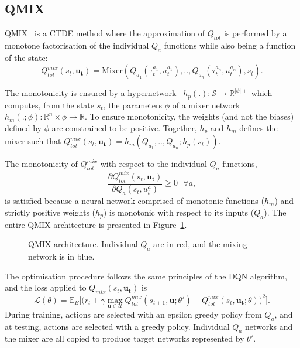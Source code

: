 \subsection{QMIX}
QMIX~\citep{Rashid2018} is a CTDE method where the approximation of $Q_{tot}$ is performed by a monotone factorisation of the individual $Q_a$ functions while also being a function of the state:
\begin{equation}
     Q_{tot}^{mix}(s_t, \mathbf{u_t})=\text{Mixer} \left(Q_{a_1}(\tau^{a_1}_t, u_t^{a_1}) ,..,Q_{a_n}(\tau^{a_n}_t, u_t^{a_n}), s_t\right).
     \label{eq:ch3_qmixappendix}
\end{equation}

The monotonicity is ensured by a hypernetwork~\citep{Ha2016HyperNetworks} $h_p(.): \mathcal{S} \rightarrow \mathbb{R}^{|\phi|+}$ which computes, from the state $s_t$, the parameters $\phi$ of a mixer network $h_m(.;\phi):\mathbb{R}^n \times \phi \rightarrow \mathbb{R}$.
To ensure monotonicity, the weights (and not the biases) defined by $\phi$ are constrained to be positive.
Together, $h_p$ and $h_m$ defines the mixer such that $ Q_{tot}^{mix}(s_t, \mathbf{u_t}) = h_m\left(Q_{a_1},..,Q_{a_n}; h_p(s_t)\right)$.

The monotonicity of $Q_{tot}^{mix}$ with respect to the individual $Q_a$ functions, 
\begin{equation}
    \frac{\partial Q_{tot}^{mix}(s_t, \mathbf{u_t})}{\partial Q_{a}(s_t, u_t^{a})} \geq 0 \text{ } \forall a
    \label{eq:ch3_monotonicity},
\end{equation}
is satisfied because a neural network comprised of monotonic functions ($h_m$) and strictly positive weights ($h_p$) is monotonic with respect to its inputs ($Q_a$). 
The entire QMIX architecture is presented in Figure~\ref{fig:qmix}.

\begin{figure}
\centering

\caption{QMIX architecture. Individual $Q_a$ are in red, and the mixing network is in blue.}
\label{fig:qmix}
\end{figure}

The optimisation procedure follows the same principles of the DQN algorithm, and the loss applied to $Q_{mix}(s_t, \mathbf{u_t})$ is 
\begin{equation}
    \mathcal{L}(\theta) = \mathbb{E}_{B}
    \bigg[  
    \big(r_{t} + \gamma \max_{\mathbf{u} \in \mathcal{U}} Q_{tot}^{mix}(s_{t+1}, \mathbf{u}; \theta')
    - Q_{tot}^{mix}(s_{t}, \mathbf{u_{t}}; \theta)\big)^{2}
    \bigg].
    \label{eq:QMIX_loss}
\end{equation}
During training, actions are selected with an epsilon greedy policy from $Q_a$, and at testing, actions are selected with a greedy policy.
Individual $Q_a$ networks and the mixer are all copied to produce target networks represented by $\theta'$.

